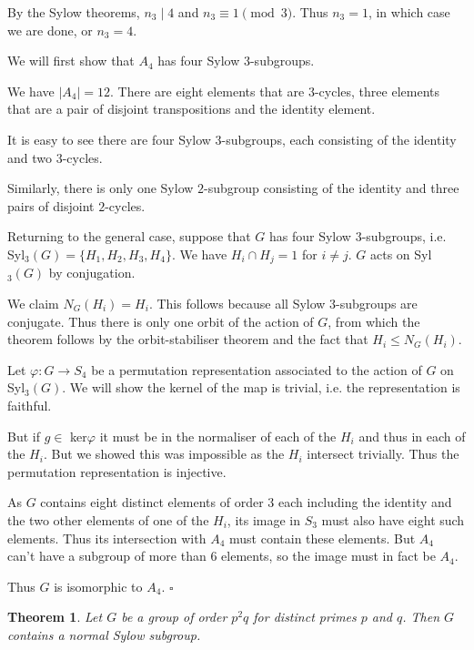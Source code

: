 \documentclass[10pt]{article}
\newtheorem{theorem}{Theorem}[section]
\newenvironment{proof}[1][Proof]{\begin{trivlist}
\item[\hskip \labelsep {\itshape #1}]}{\end{trivlist}}
\begin{document}
\begin{proof}
By the Sylow theorems, $n_3 \;|\; 4$ and $n_3 \equiv 1 \pmod{3}$. Thus $n_3 = 1$, in which case we are done, or $n_3 = 4$.

We will first show that $A_4$ has four Sylow $3$-subgroups.

We have $|A_4| = 12$. There are eight elements that are $3$-cycles, three elements that are a pair of disjoint transpositions and the identity element.

It is easy to see there are four Sylow $3$-subgroups, each consisting of the identity and two $3$-cycles.

Similarly, there is only one Sylow $2$-subgroup consisting of the identity and three pairs of disjoint $2$-cycles.

Returning to the general case, suppose that $G$ has four Sylow $3$-subgroups, i.e. Syl$_3(G) = \{H_1, H_2, H_3, H_4\}$. We have $H_i\cap H_j = 1$ for $i \neq j$. $G$ acts on Syl$_3(G)$ by conjugation.

We claim $N_G(H_i) = H_i$. This follows because all Sylow $3$-subgroups are conjugate. Thus there is only one orbit of the action of $G$, from which the theorem follows by the orbit-stabiliser theorem and the fact that $H_i \leq N_G(H_i)$.

Let $\varphi : G \to S_4$ be a permutation representation associated to the action of $G$ on Syl$_3(G)$. We will show the kernel of the map is trivial, i.e. the representation is faithful.

But if $g \in$ ker$\varphi$ it must be in the normaliser of each of the $H_i$ and thus in each of the $H_i$. But we showed this was impossible as the $H_i$ intersect trivially. Thus the permutation representation is injective.

As $G$ contains eight distinct elements of order $3$ each including the identity and the two other elements of one of the $H_i$, its image in $S_3$ must also have eight such elements. Thus its intersection with $A_4$ must contain these elements. But $A_4$ can't have a subgroup of more than $6$ elements, so the image must in fact be $A_4$.

Thus $G$ is isomorphic to $A_4$. $\square$
\end{proof}

\begin{theorem}
Let $G$ be a group of order $p^2q$ for distinct primes $p$ and $q$. Then $G$ contains a normal Sylow subgroup.
\end{theorem}
\end{document}
